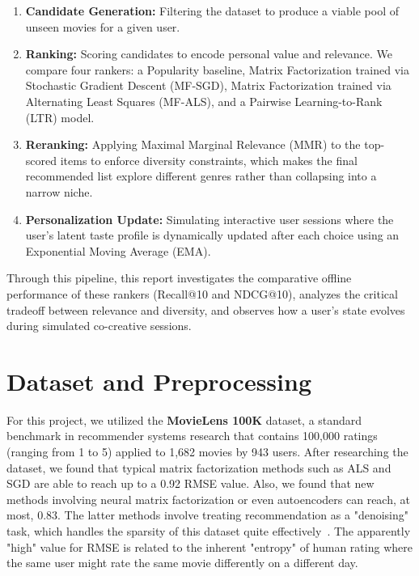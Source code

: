 \documentclass[11pt]{article}
\begin{document}
\begin{enumerate}
    \item \textbf{Candidate Generation:} Filtering the dataset to produce a viable pool of unseen movies for a given user.
    \item \textbf{Ranking:} Scoring candidates to encode personal value and relevance. We compare four rankers: a Popularity baseline, Matrix Factorization trained via Stochastic Gradient Descent (MF-SGD), Matrix Factorization trained via Alternating Least Squares (MF-ALS), and a Pairwise Learning-to-Rank (LTR) model.
    \item \textbf{Reranking:} Applying Maximal Marginal Relevance (MMR) to the top-scored items to enforce diversity constraints, which makes the final recommended list explore different genres rather than collapsing into a narrow niche.
    \item \textbf{Personalization Update:} Simulating interactive user sessions where the user's latent taste profile is dynamically updated after each choice using an Exponential Moving Average (EMA).
\end{enumerate}

\noindent Through this pipeline, this report investigates the comparative offline performance of these rankers (Recall@10 and NDCG@10), analyzes the critical tradeoff between relevance and diversity, and observes how a user's state evolves during simulated co-creative sessions.


\section{Dataset and Preprocessing}
\label{sec:dataset}

\noindent For this project, we utilized the \textbf{MovieLens 100K} dataset, a standard benchmark in recommender systems research that contains 100,000 ratings (ranging from 1 to 5) applied to 1,682 movies by 943 users. After researching the dataset, we found that typical matrix factorization methods such as ALS and SGD are able to reach up to a 0.92 RMSE value. Also, we found that new methods involving neural matrix factorization or even autoencoders can reach, at most, 0.83. The latter methods involve treating recommendation as a "denoising" task, which handles the sparsity of this dataset quite effectively~\cite{DBLP:journals/corr/abs-1901-00415}. The apparently "high" value for RMSE is related to the inherent "entropy" of human rating where the same user might rate the same movie differently on a different day.
\end{document}
